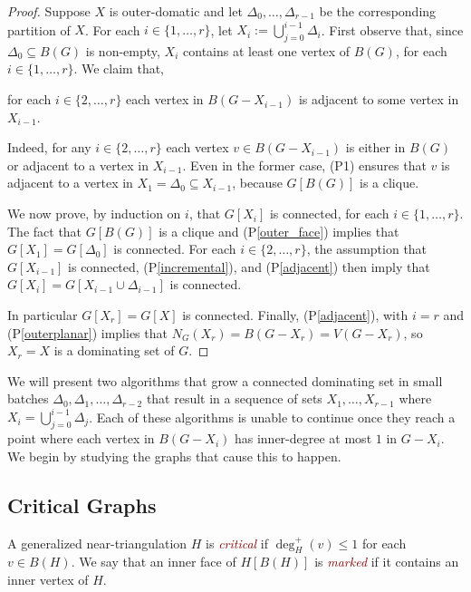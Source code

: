 \documentclass[a4paper,UKenglish,cleveref, autoref, thm-restate]{lipics-v2021}
\newcommand{\pref}[1]{(P\ref{#1})}
\newcommand{\defin}[1]{\emph{\textcolor{Maroon}{#1}}}
\begin{document}
\begin{proof}
  Suppose $X$ is outer-domatic and let $\Delta_0,\ldots,\Delta_{r-1}$ be the corresponding partition of $X$.  For each $i\in\{1,\ldots,r\}$, let $X_i:=\bigcup_{j=0}^{i-1} \Delta_i$.  First observe that, since $\Delta_0\subseteq B(G)$ is non-empty, $X_i$ contains at least one vertex of $B(G)$, for each $i\in\{1,\ldots,r\}$. We claim that,
  \begin{compactenum}[(P1)]\setcounter{enumi}{3}
    \item for each $i\in\{2,\ldots,r\}$ each vertex in $B(G-X_{i-1})$ is adjacent to some vertex in $X_{i-1}$. \label{adjacent}
  \end{compactenum}
  Indeed, for any $i\in\{2,\ldots,r\}$ each vertex $v\in B(G-X_{i-1})$ is either in $B(G)$ or adjacent to a vertex in $X_{i-1}$. Even in the former case, (P1) ensures that $v$ is adjacent to a vertex in $X_1=\Delta_0\subseteq X_{i-1}$, because $G[B(G)]$ is a clique.

  We now prove, by induction on $i$, that $G[X_i]$ is connected, for each $i\in\{1,\ldots,r\}$.
  The fact that $G[B(G)]$ is a clique and \pref{outer_face} implies that $G[X_1]=G[\Delta_0]$ is connected. For each $i\in\{2,\ldots,r\}$, the assumption that $G[X_{i-1}]$ is connected, \pref{incremental}, and \pref{adjacent} then imply that $G[X_i]=G[X_{i-1}\cup\Delta_{i-1}]$ is connected.

  In particular $G[X_r]=G[X]$ is connected.  Finally, \pref{adjacent}, with $i=r$ and \pref{outerplanar} implies that $N_G(X_r)=B(G-X_r)=V(G-X_r)$, so $X_r=X$ is a dominating set of $G$.
\end{proof}

We will present two algorithms that grow a connected dominating set in small batches $\Delta_0,\Delta_1,\ldots,\Delta_{r-2}$ that result in a sequence of sets $X_1,\ldots,X_{r-1}$ where $X_{i}=\bigcup_{j=0}^{i-1}\Delta_j$.  Each of these algorithms is unable to continue once they reach a point where each vertex in $B(G-X_i)$ has inner-degree at most $1$ in $G-X_i$.  We begin by studying the graphs that cause this to happen.

\subsection{Critical Graphs}

A generalized near-triangulation $H$ is \defin{critical} if $\deg^+_H(v)\le 1$ for each $v\in B(H)$. We say that an inner face of $H[B(H)]$ is \defin{marked} if it contains an inner vertex of $H$.
\end{document}
